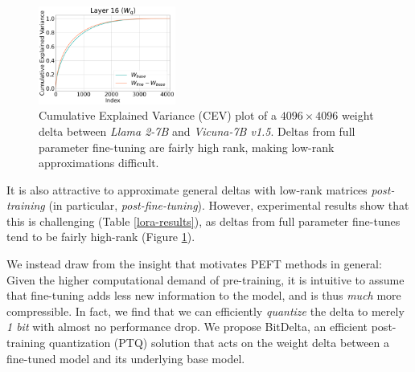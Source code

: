 \documentclass[numbers]{article}
\newcommand{\oursmethod}{BitDelta\xspace}
\begin{document}
\begin{figure} %
  \centering
  \includegraphics[width=0.4\textwidth]{highrank.png} %
  \caption{Cumulative Explained Variance (CEV) plot of a $4096 \times 4096$ weight delta between \textit{Llama 2-7B} and \textit{Vicuna-7B v1.5}. Deltas from full parameter fine-tuning are fairly high rank, making low-rank approximations difficult.}
  \label{fig:highrank}
\end{figure}

It is also attractive to approximate general deltas with low-rank matrices \emph{post-training} (in particular, \emph{post-fine-tuning}). However, experimental results show that this is challenging (Table \ref{lora-results}), as deltas from full parameter fine-tunes tend to be fairly high-rank (Figure \ref{fig:highrank}). 






We instead draw from the insight that motivates PEFT methods in general: Given the higher computational demand of pre-training, it is intuitive to assume that fine-tuning adds less new information to the model, and is thus \emph{much} more compressible. In fact, we find that we can efficiently \emph{quantize} the delta to merely \emph{1 bit} with almost no performance drop. We propose \oursmethod, an efficient post-training quantization (PTQ) solution that acts on the weight delta between a fine-tuned model and its underlying base model. 
\end{document}
